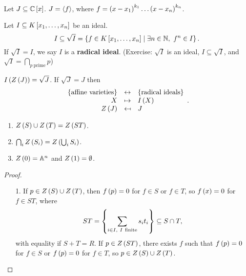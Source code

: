 \begin{example}
Let $ J \subseteq \C\sb{x} $. $ J = \ab{f} $, where $ f = \rb{x - x_1}^{k_1} \dots \rb{x - x_n}^{k_n} $.
\end{example}

\begin{definition}
Let $ I \subseteq K\sb{x_1, \dots, x_n} $ be an ideal.
$$ I \subseteq \sqrt{I} = \cb{f \in K\sb{x_1, \dots, x_n} \mid \exists n \in \N, \ f^n \in I}. $$
If $ \sqrt{I} = I $, we say $ I $ is a \textbf{radical ideal}. (Exercise: $ \sqrt{I} $ is an ideal, $ I \subseteq \sqrt{I} $, and $ \sqrt{I} = \bigcap_{p \ \text{prime}} p $)
\end{definition}

\begin{theorem}
$ I\rb{Z\rb{J}} = \sqrt{J} $. If $ \sqrt{J} = J $ then
$$
\begin{array}{rcl}
\cb{\text{affine varieties}} & \leftrightarrow & \cb{\text{radical ideals}} \\
X & \mapsto & I\rb{X} \\
Z\rb{J} & \mapsfrom & J
\end{array}.
$$
\end{theorem}


\begin{proposition}
\hfill
\begin{enumerate}
\item $ Z\rb{S} \cup Z\rb{T} = Z\rb{ST} $.
\item $ \bigcap_i Z\rb{S_i} = Z\rb{\bigcup_i S_i} $.
\item $ Z\rb{0} = \A^n $ and $ Z\rb{1} = \emptyset $.
\end{enumerate}
\end{proposition}

\begin{proof}
\hfill
\begin{itemize}
\item[1.] If $ p \in Z\rb{S} \cup Z\rb{T} $, then $ f\rb{p} = 0 $ for $ f \in S $ or $ f \in T $, so $ f\rb{x} = 0 $ for $ f \in ST $, where
$$ ST = \cb{\sum_{i \in I, \ I \ \text{finite}} s_it_i} \subseteq S \cap T, $$
with equality if $ S + T = R $. If $ p \in Z\rb{ST} $, there exists $ f $ such that $ f\rb{p} = 0 $ for $ f \in S $ or $ f\rb{p} = 0 $ for $ f \in T $, so $ p \in Z\rb{S} \cup Z\rb{T} $.
\end{itemize}
\end{proof}

